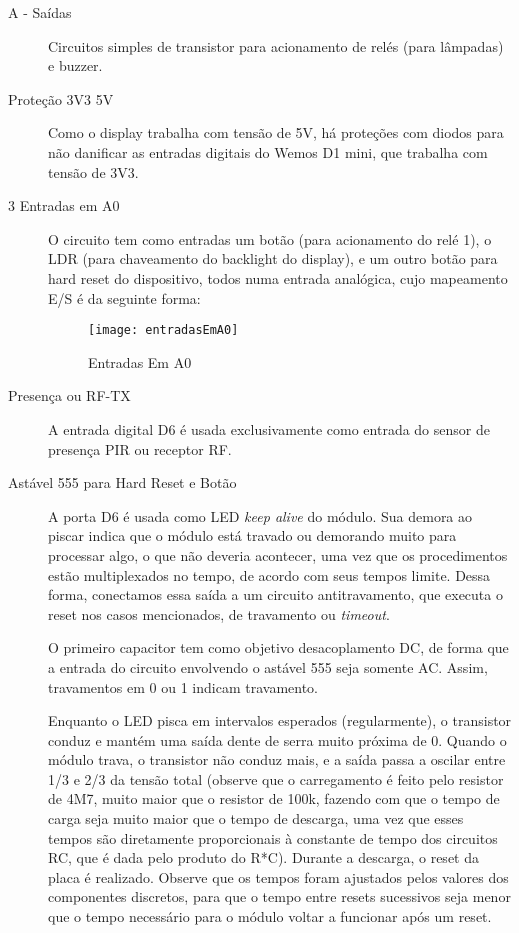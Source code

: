 \begin{description}
\item [A - Saídas] Circuitos simples de transistor para acionamento de relés (para lâmpadas) e buzzer.
\item [Proteção 3V3 5V] Como o display trabalha com tensão de 5V, há proteções com diodos para não danificar as entradas digitais do Wemos D1 mini, que trabalha com tensão de 3V3.
\item [3 Entradas em A0] O circuito tem como entradas um botão (para acionamento do relé 1), o LDR (para chaveamento do backlight do display), e um outro botão para hard reset do dispositivo, todos numa entrada analógica, cujo mapeamento E/S é da seguinte forma:

\begin{figure}[H]
	\centering
	\caption{Entradas Em A0}
  \texttt{[image: entradasEmA0]}
\label{fig:entradasEmA0}
\end{figure}

\item [Presença ou RF-TX] A entrada digital D6 é usada exclusivamente como entrada do sensor de presença PIR ou receptor RF.
\item [Astável 555 para Hard Reset e Botão] A porta D6 é usada como LED \textit{keep alive} do módulo. Sua demora ao piscar indica que o módulo está travado ou demorando muito para processar algo, o que não deveria acontecer, uma vez que os procedimentos estão multiplexados no tempo, de acordo com seus tempos limite. Dessa forma, conectamos essa saída a um circuito antitravamento, que executa o reset nos casos mencionados, de travamento ou \textit{timeout}.

O primeiro capacitor tem como objetivo desacoplamento DC, de forma que a entrada do circuito envolvendo o astável 555 seja somente AC. Assim, travamentos em 0 ou 1 indicam travamento.

Enquanto o LED pisca em intervalos esperados (regularmente), o transistor conduz e mantém uma saída dente de serra muito próxima de 0. Quando o módulo trava, o transistor não conduz mais, e a saída passa a oscilar entre 1/3 e 2/3 da tensão total (observe que o carregamento é feito pelo resistor de 4M7, muito maior que o resistor de 100k, fazendo com que o tempo de carga seja muito maior que o tempo de descarga, uma vez que esses tempos são diretamente proporcionais à constante de tempo dos circuitos RC, que é dada pelo produto do R*C). Durante a descarga, o reset da placa é realizado. Observe que os tempos foram ajustados pelos valores dos componentes discretos, para que o tempo entre resets sucessivos seja menor que o tempo necessário para o módulo voltar a funcionar após um reset.


\end{description}

